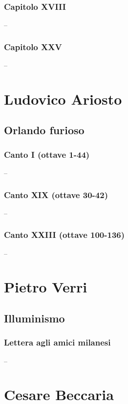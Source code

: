 \documentclass{article}
\begin{document}
\subsubsection{Capitolo XVIII}

--

\newpage
\subsubsection{Capitolo XXV}

--

\newpage
\section{Ludovico Ariosto}
\subsection{Orlando furioso}
\subsubsection{Canto I (ottave 1-44)}

--

\newpage
\subsubsection{Canto XIX (ottave 30-42)}

--

\newpage
\subsubsection{Canto XXIII (ottave 100-136)}

--

\newpage
\section{Pietro Verri}
\subsection{Illuminismo}
\subsubsection{Lettera agli amici milanesi}

--

\newpage
\section{Cesare Beccaria}
\end{document}
